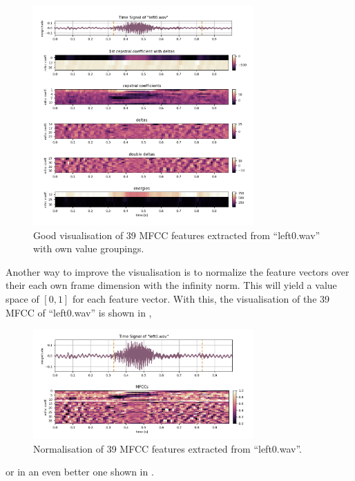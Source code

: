 \begin{figure}[!ht]
  \centering
    \includegraphics[width=0.75\textwidth]{./3_signal/figs/signal_mfcc_left0_norm0.png}
  \caption{Good visualisation of 39 MFCC features extracted from \enquote{left0.wav} with own value groupings.}
  \label{fig:left0_order}
\end{figure}
\FloatBarrier
\noindent
Another way to improve the visualisation is to normalize the feature vectors over their each own frame dimension with the infinity norm. This will yield a value space of $[0, 1]$ for each feature vector. With this, the visualisation of the 39 MFCC of \enquote{left0.wav} is shown in ,

\begin{figure}[!ht]
  \centering
    \includegraphics[width=0.75\textwidth]{./3_signal/figs/signal_mfcc_left0_no_order_norm1.png}
  \caption{Normalisation of 39 MFCC features extracted from \enquote{left0.wav}.}
  \label{fig:left0_no_order_norm1}
\end{figure}
\FloatBarrier
\noindent
or in an even better one shown in .

